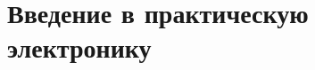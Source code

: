 

\tableofcontents\clearpage


% 
\part{Введение в практическую электронику}\label{collis}



% 
%

%

% 

% 
% 



% 

% 

\printbibliography

\printindex


